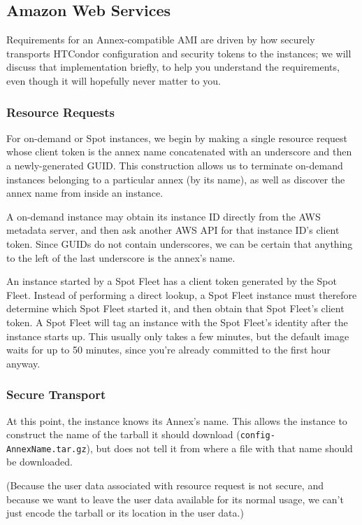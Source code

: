 \subsection{\label{sec:clouds-services-aws}Amazon Web Services}

Requirements for an Annex-compatible AMI are driven by how 
securely transports HTCondor configuration and security tokens to the
instances; we will discuss that implementation briefly, to help you
understand the requirements, even though it will hopefully never matter
to you.

\subsubsection{Resource Requests}

For on-demand or Spot instances, we begin by making a single resource request
whose client token is the annex name concatenated with an underscore and then
a newly-generated GUID.  This construction allows us to terminate on-demand
instances belonging to a particular annex (by its name), as well as discover
the annex name from inside an instance.

A on-demand instance may obtain its instance ID directly from the AWS
metadata server, and then ask another AWS API for that instance ID's
client token.  Since GUIDs do not contain underscores, we can be certain
that anything to the left of the last underscore is the annex's name.

An instance started by a Spot Fleet has a client token generated by the
Spot Fleet.  Instead of performing a direct lookup, a Spot Fleet instance
must therefore determine which Spot Fleet started it, and then obtain that
Spot Fleet's client token.  A Spot Fleet will tag an instance with the
Spot Fleet's identity after the instance starts up.  This usually only
takes a few minutes, but the default image waits for up to 50 minutes,
since you're already committed to the first hour anyway.

\subsubsection{Secure Transport}

At this point, the instance knows its Annex's name.  This allows the
instance to construct the name of the tarball it should download
({\tt config-AnnexName.tar.gz}), but does not tell it from where a file
with that name should be downloaded.

(Because the user data associated with resource request is not secure,
and because we want to leave the user data available for its normal
usage, we can't just encode the tarball or its location in the user data.)

